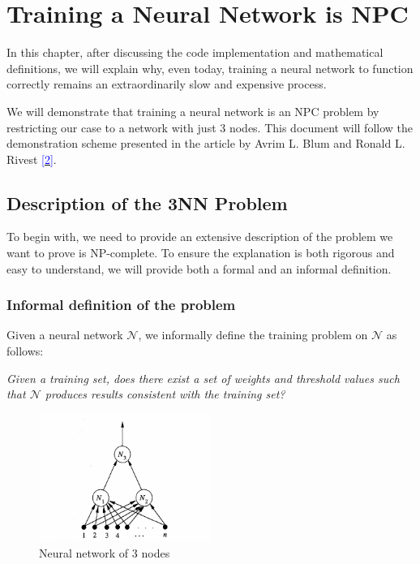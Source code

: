 \documentclass[../main]{subfiles}
\begin{document}
\chapter{Training a Neural Network is NPC}

{
\hypersetup{linkcolor=black}
\minitoc
\vspace{5mm}
}

In this chapter, after discussing the code implementation and mathematical definitions, we will explain why, even today, training a neural network to function correctly remains an extraordinarily slow and expensive process. 

We will demonstrate that training a neural network is an NPC problem by restricting our case to a network with just 3 nodes. This document will follow the demonstration scheme presented in the article by Avrim L. Blum and Ronald L. Rivest \hyperlink{target}{\textcolor{blue}{[2]}}.
\section{Description of the 3NN Problem}
To begin with, we need to provide an extensive description of the problem we want to prove is NP-complete. To ensure the explanation is both rigorous and easy to understand, we will provide both a formal and an informal definition.

\subsection{Informal definition of the problem}
Given a neural network \(\mathcal{N}\), we informally define the training problem on \(\mathcal{N}\) as follows:
\begin{center}
    \textit{Given a training set, does there exist a set of weights and threshold values such that \(\mathcal{N}\) produces results consistent with the training set?}
\end{center}
\begin{figure}[H]
  \centering
  \includegraphics[width=0.5\textwidth]{./figures/modelo}
  \caption{Neural network of 3 nodes}
  \label{fig:red}
\end{figure}
\end{document}
